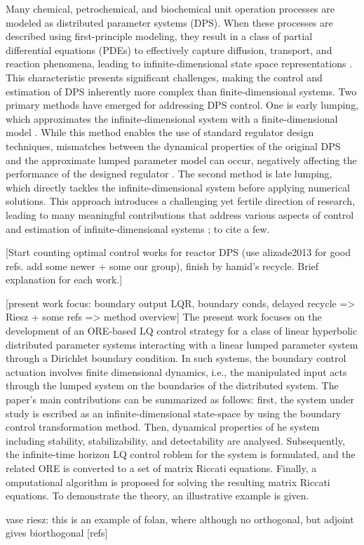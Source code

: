 Many chemical, petrochemical, and biochemical unit operation processes are modeled as distributed parameter systems (DPS). When these processes are described using first-principle modeling, they result in a class of partial differential equations (PDEs) to effectively capture diffusion, transport, and reaction phenomena, leading to infinite-dimensional state space representations \autocite{ray1981advanced,christofides1998robust}. This characteristic presents significant challenges, making the control and estimation of DPS inherently more complex than finite-dimensional systems. Two primary methods have emerged for addressing DPS control. One is early lumping, which approximates the infinite-dimensional system with a finite-dimensional model \autocite{davison1976robust, francis1977linear}. While this method enables the use of standard regulator design techniques, mismatches between the dynamical properties of the original DPS and the approximate lumped parameter model can occur, negatively affecting the performance of the designed regulator \autocite{moghadam2012infinite}. The second method is late lumping, which directly tackles the infinite-dimensional system before applying numerical solutions. This approach introduces a challenging yet fertile direction of research, leading to many meaningful contributions that address various aspects of control and estimation of infinite-dimensional systems \autocite{dubljevic2006predictive1, dubljevic2006predictive2, xu2016state, ozorio2019heat, cassol2024chemostat}; to cite a few.

[Start counting optimal control works for reactor DPS (use alizade2013 for good refs. add some newer + some our group), finish by hamid's recycle. Brief explanation for each work.]

[present work focus: boundary output LQR, boundary conds, delayed recycle => Riesz + some refs => method overview]
    The present work focuses on the development of an ORE-based LQ control strategy for a class of linear hyperbolic distributed  parameter systems interacting with a linear lumped parameter system through a Dirichlet boundary condition.
    In such systems, the  boundary control actuation involves finite dimensional dynamics, i.e., the manipulated input acts through the lumped system on the  boundaries of the distributed system.
    The paper’s main contributions can be summarized as follows:
        first, the system under study is  escribed as an infinite-dimensional state-space by using the boundary control transformation method.
        Then, dynamical properties of  he system including stability, stabilizability, and detectability are analysed.
        Subsequently, the infinite-time horizon LQ control  roblem for the system is formulated, and the related ORE is converted to a set of matrix Riccati equations.
        Finally, a  omputational algorithm is proposed for solving the resulting matrix Riccati equations.
        To demonstrate the theory, an illustrative example is given.

vase riesz: this is an example of folan, where although no orthogonal, but adjoint gives biorthogonal [refs]